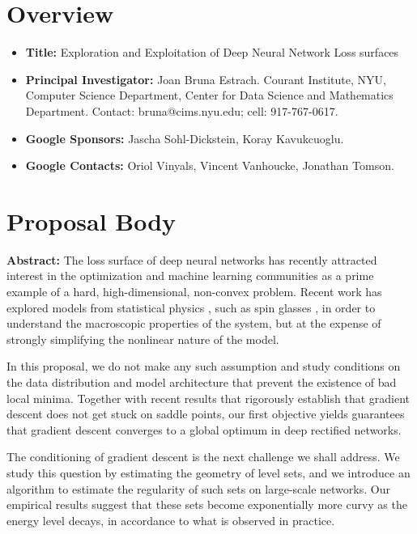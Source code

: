 \documentclass[11pt]{article}
\begin{document}


\section{Overview}
\begin{itemize}
\item \textbf{Title:} Exploration and Exploitation of Deep Neural Network Loss surfaces  
\item \textbf{Principal Investigator: } Joan Bruna Estrach. Courant Institute, NYU, Computer Science Department, Center for Data Science and Mathematics Department.  
Contact: bruna@cims.nyu.edu; cell: 917-767-0617. 
\item \textbf{Google Sponsors:} Jascha Sohl-Dickstein, Koray Kavukcuoglu.
\item \textbf{Google Contacts:} Oriol Vinyals, Vincent Vanhoucke, Jonathan Tomson.
\end{itemize}

\section{Proposal Body}

\textbf{Abstract:}
The loss surface of deep neural networks has recently attracted interest 
in the optimization and machine learning communities as a prime example of 
a hard, high-dimensional, non-convex problem. 
Recent work has explored models from statistical physics \cite{ganguli}, such as spin glasses \cite{choromaska}, 
in order to understand the macroscopic properties of the system,
 but at the expense of strongly simplifying the nonlinear nature of the model.

In this proposal, we do not make any such assumption and study conditions 
on the data distribution and model architecture that prevent the existence 
of bad local minima. Together with 
recent results that rigorously establish that gradient descent does not 
get stuck on saddle points, our first objective yields guarantees that gradient descent converges
to a global optimum in deep rectified networks. 

The conditioning of gradient descent is the next challenge we shall address. 
We study this question by estimating the geometry of level sets, and we introduce
an algorithm to estimate the regularity of such sets on large-scale networks. 
Our empirical results suggest that these sets become exponentially more curvy 
as the energy level decays, in accordance to what is observed in practice. 
\end{document}
